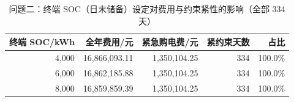 \begin{table}[H]
  \centering
  \caption{问题二：终端 SOC（日末储备）设定对费用与约束紧性的影响（全部 334 天）}
  \label{tab:q2-terminal}
  \small
  \begin{tabular}{rrrrr}
    \toprule
    终端 SOC/kWh & 全年费用/元 & 紧急购电费/元 & 紧约束天数 & 占比 \\
    \midrule
    4,000 & 16,866,093.11 & 1,350,104.25 & 334 & 100.0\% \\
    6,000 & 16,862,185.88 & 1,350,104.25 & 334 & 100.0\% \\
    8,000 & 16,859,859.39 & 1,350,104.25 & 334 & 100.0\% \\
    \bottomrule
  \end{tabular}
\end{table}